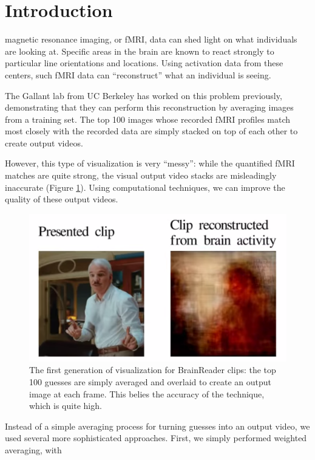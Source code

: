 
\section{Introduction}
 magnetic resonance imaging, or fMRI, data can shed light on what individuals are looking at.  Specific areas in the brain are known to react strongly to particular line orientations and locations.  Using activation data from these centers, such fMRI data can ``reconstruct'' what an individual is seeing.

The Gallant lab from UC Berkeley has worked on this problem previously, demonstrating  that they can perform this reconstruction by averaging images from a training set.  The top 100 images whose recorded fMRI profiles match most closely with the recorded data are simply stacked on top of each other to create output videos.

However, this type of visualization is very ``messy'': while the quantified fMRI matches are quite strong, the visual output video stacks are misleadingly inaccurate (Figure \ref{fig:avg}).  Using computational techniques, we can improve the quality of these output videos.


\begin{figure}[t]
\centering
    \includegraphics[width=1.0\columnwidth]{figures/average.png}
\caption{The first generation of visualization for BrainReader clips: the top 100 guesses are simply averaged and overlaid to create an output image at each frame.  This belies the accuracy of the technique, which is quite high.}
\label{fig:avg}
\end{figure}


Instead of a simple averaging process for turning guesses into an output video, we used several more sophisticated approaches.  First, we simply performed weighted averaging, with 
